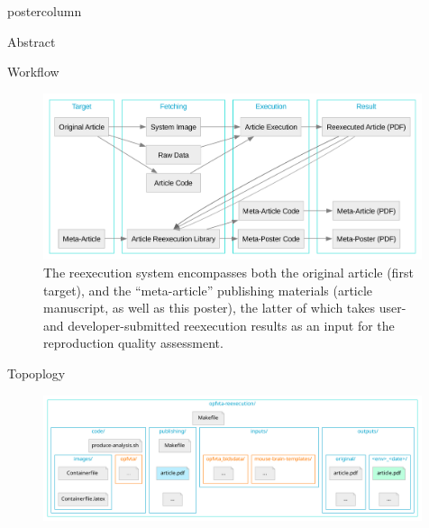 \begin{frame}
\begin{columns}
	\begin{column}{.42\textwidth}
		\begin{beamercolorbox}[center]{postercolumn}
			\begin{minipage}{.98\textwidth}  %
				\parbox[t][\columnheight]{\textwidth}{ %
					\begin{myblock}{Abstract}
						
					\end{myblock}\vfill
					\vspace{-0.3em}
					\begin{myblock}{Workflow}
						\vspace{0.5em}
						\begin{figure}
							\includegraphics[width=0.99\textwidth]{img/workflow.pdf}
							\caption{
								The reexecution system encompasses both the original article (first target), and the “meta-article” publishing materials (article manuscript, as well as this poster), the latter of which takes user- and developer-submitted reexecution results as an input for the reproduction quality assessment.
							}
						\end{figure}
					\end{myblock}\vfill
					\vspace{-0.3em}
					\begin{myblock}{Topoplogy}
						\vspace{0.5em}
						\begin{figure}
							\captionsetup{width=.9\linewidth}
							\includegraphics[width=0.99\textwidth]{img/topology.pdf}

\end{figure}
\end{myblock}}
\end{minipage}
\end{beamercolorbox}
\end{column}
\end{columns}
\end{frame}
